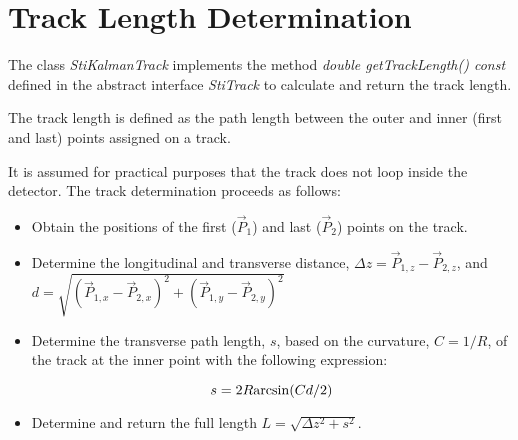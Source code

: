 \documentclass{revtex4}
\newcommand{ \be }{\begin{equation}}
\newcommand{ \ee }{\end{equation}}
\begin{document}
\section{Track Length Determination}

The class {\em StiKalmanTrack} implements the method 
{\em double getTrackLength() const} defined in the 
abstract interface {\em StiTrack} to calculate and return 
the track length. 

The track length is defined as the path length between the 
outer and inner (first and last) points assigned on a track.

It is assumed for practical purposes that the track does not 
loop inside the detector. The track determination proceeds as follows:

\begin{itemize}
\item Obtain the positions of the first ($\vec{P}_1$) and 
last ($\vec{P}_2$) points on the track. 
\item Determine the longitudinal and transverse distance, 
$\Delta z=\vec{P}_{1,z} - \vec{P}_{2,z}$,
and $d=\sqrt{(\vec{P}_{1,x} - \vec{P}_{2,x})^2+
(\vec{P}_{1,y} - \vec{P}_{2,y})^2}$
\item Determine the transverse path length, $s$, based on the 
curvature, $C=1/R$, of the track at the inner point with 
the following expression:

\be
s = 2 R {\rm arcsin}(Cd/2)
\ee

\item Determine and return the full length $L=\sqrt{\Delta z^2+s^2}$.
\end{itemize}
\end{document}
